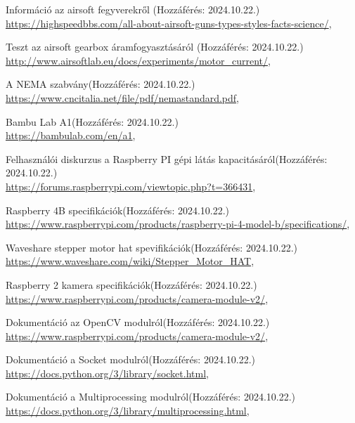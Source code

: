\documentclass[12pt,a4paper]{article}
\begin{document}
\begin{thebibliography}{}
	Információ az airsoft fegyverekről \hfill (Hozzáférés: 2024.10.22.) \\
	{\footnotesize \url{https://highspeedbbs.com/all-about-airsoft-guns-types-styles-facts-science/}},

	
	Teszt az airsoft gearbox áramfogyasztásáról \hfill (Hozzáférés: 2024.10.22.) \\
	{\footnotesize \url{http://www.airsoftlab.eu/docs/experiments/motor_current/}},
	
	
	A NEMA szabvány\hfill (Hozzáférés: 2024.10.22.) \\
	{\footnotesize \url{https://www.cncitalia.net/file/pdf/nemastandard.pdf}},
	
	Bambu Lab A1\hfill (Hozzáférés: 2024.10.22.) \\
	{\footnotesize \url{https://bambulab.com/en/a1}},

	
	Felhasználói diskurzus a Raspberry PI gépi látás kapacitásáról\hfill (Hozzáférés: 2024.10.22.) \\
	{\footnotesize \url{https://forums.raspberrypi.com/viewtopic.php?t=366431}},
	
	Raspberry 4B specifikációk\hfill (Hozzáférés: 2024.10.22.) \\
	{\footnotesize \url{https://www.raspberrypi.com/products/raspberry-pi-4-model-b/specifications/}},
	
	Waveshare stepper motor hat spevifikációk\hfill (Hozzáférés: 2024.10.22.) \\
	{\footnotesize \url{https://www.waveshare.com/wiki/Stepper_Motor_HAT}},

	Raspberry 2 kamera specifikációk\hfill (Hozzáférés: 2024.10.22.) \\
	{\footnotesize \url{https://www.raspberrypi.com/products/camera-module-v2/}},
	
	Dokumentáció az OpenCV modulról\hfill (Hozzáférés: 2024.10.22.) \\
	{\footnotesize \url{https://www.raspberrypi.com/products/camera-module-v2/}},
	
	Dokumentáció a Socket modulról\hfill (Hozzáférés: 2024.10.22.) \\
	{\footnotesize \url{https://docs.python.org/3/library/socket.html}},
	
	Dokumentáció a Multiprocessing modulról\hfill (Hozzáférés: 2024.10.22.) \\
	{\footnotesize \url{https://docs.python.org/3/library/multiprocessing.html}},
	

\end{thebibliography}
\end{document}

